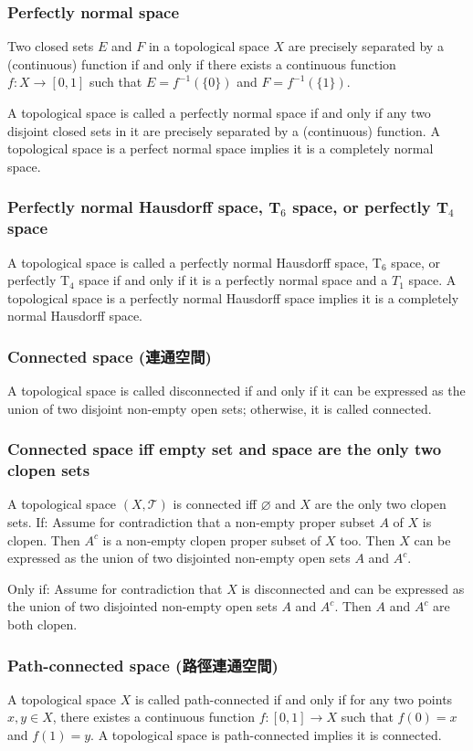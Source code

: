 \documentclass[a4paper,12pt]{article}
\begin{document}
\subsubsection{Perfectly normal space}
Two closed sets $E$ and $F$ in a topological space $X$ are precisely separated by a (continuous) function if and only if there exists a continuous function $f\colon X\to [0,1]$ such that $E=f^{-1}(\{0\})$ and $F=f^{-1}(\{1\})$.

A topological space is called a perfectly normal space if and only if any two disjoint closed sets in it are precisely separated by a (continuous) function. A topological space is a perfect normal space implies it is a completely normal space.
\subsubsection{Perfectly normal Hausdorff space, T$_6$ space, or perfectly T$_4$ space}
A topological space is called a perfectly normal Hausdorff space, T$_6$ space, or perfectly T$_4$ space if and only if it is a perfectly normal space and a $T_1$ space. A topological space is a perfectly normal Hausdorff space implies it is a completely normal Hausdorff space.
\subsubsection{Connected space (連通空間)}
A topological space is called disconnected if and only if it can be expressed as the union of two disjoint non-empty open sets; otherwise, it is called connected.
\subsubsection{Connected space iff empty set and space are the only two clopen sets}
A topological space $(X,\mathcal{T})$ is connected iff $\varnothing$ and $X$ are the only two clopen sets.
\bpr
If: Assume for contradiction that a non-empty proper subset $A$ of $X$ is clopen. Then $A^c$ is a non-empty clopen proper subset of $X$ too. Then $X$ can be expressed as the union of two disjointed non-empty open sets $A$ and $A^c$.

Only if: Assume for contradiction that $X$ is disconnected and can be expressed as the union of two disjointed non-empty open sets $A$ and $A^c$. Then $A$ and $A^c$ are both clopen.
\epr
\subsubsection{Path-connected space (路徑連通空間)}
A topological space $X$ is called path-connected if and only if for any two points $x,y\in X$, there existes a continuous function $f\colon[0,1]\to X$ such that $f(0)=x$ and $f(1)=y$. A topological space is path-connected implies it is connected.
\end{document}
